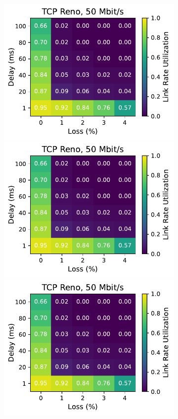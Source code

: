 \begin{figure}[ht]
\begin{subfigure}[b]{0.89cm}
        \includegraphics[width=\linewidth,trim={8cm 0 0 0},clip]{splitting/figures/heatmaps/heatmap_tcp_reno_50mbps.pdf}
        \includegraphics[width=\linewidth,trim={8cm 0 0 0},clip]{splitting/figures/heatmaps/heatmap_tcp_reno_50mbps.pdf}
        \includegraphics[width=\linewidth,trim={8cm 0 0 0},clip]{splitting/figures/heatmaps/heatmap_tcp_reno_50mbps.pdf}

\end{subfigure}
\end{figure}
